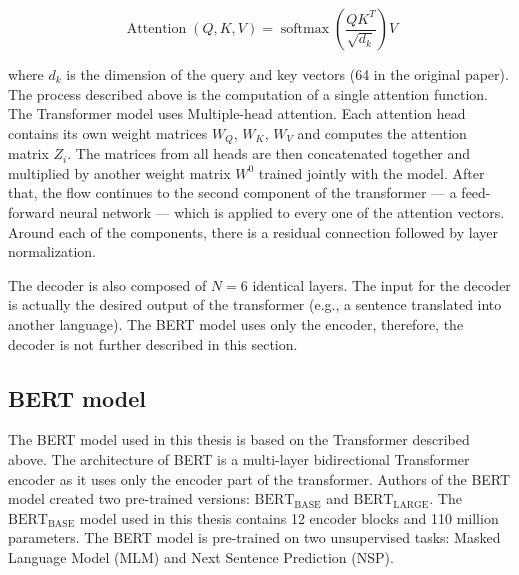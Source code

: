\begin{equation}
    \operatorname{Attention}(Q, K, V) = \operatorname{softmax} \displaystyle{(\frac{QK^T}{\sqrt{d_k}})V}
    \label{eq:attention}
\end{equation}

where $d_k$ is the dimension of the query and key vectors (64 in the original paper). The process described above is the computation of a single attention function. The Transformer model uses Multiple-head attention. Each attention head contains its own weight matrices $W_Q$, $W_K$, $W_V$ and computes the attention matrix $Z_i$. The matrices from all heads are then concatenated together and multiplied by another weight matrix $W^0$ trained jointly with the model. After that, the flow continues to the second component of the transformer --- a feed-forward neural network --- which is applied to every one of the attention vectors. Around each of the components, there is a residual connection followed by layer normalization. 

The decoder is also composed of $N=6$ identical layers. The input for the decoder is actually the desired output of the transformer (e.g., a sentence translated into another language). The BERT model uses only the encoder, therefore, the decoder is not further described in this section.

\subsection*{BERT model}
The BERT model used in this thesis is based on the Transformer described above. The architecture of BERT is a multi-layer bidirectional Transformer encoder as it uses only the encoder part of the transformer. Authors of the BERT model created two pre-trained versions: $\operatorname{BERT_{BASE}}$ and $\operatorname{BERT_{LARGE}}$. The $\operatorname{{BERT_{BASE}}}$ model used in this thesis contains 12 encoder blocks and 110 million parameters.
The BERT model is pre-trained on two unsupervised tasks: Masked Language Model (MLM) and Next Sentence Prediction (NSP).

